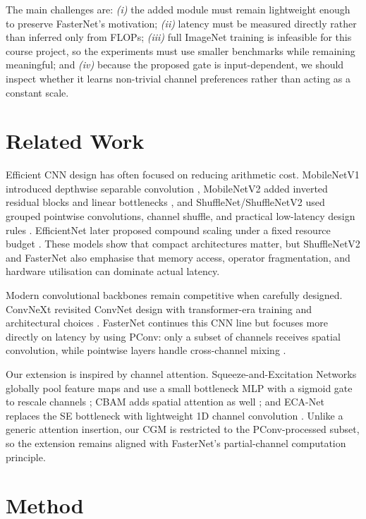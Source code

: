 \documentclass{article}
\begin{document}
The main challenges are: \emph{(i)} the added module must remain lightweight enough to preserve FasterNet's motivation; \emph{(ii)} latency must be measured directly rather than inferred only from FLOPs; \emph{(iii)} full ImageNet training is infeasible for this course project, so the experiments must use smaller benchmarks while remaining meaningful; and \emph{(iv)} because the proposed gate is input-dependent, we should inspect whether it learns non-trivial channel preferences rather than acting as a constant scale.

\section{Related Work}

Efficient CNN design has often focused on reducing arithmetic cost. MobileNetV1 introduced depthwise separable convolution \citep{howard2017mobilenets}, MobileNetV2 added inverted residual blocks and linear bottlenecks \citep{sandler2018mobilenetv2}, and ShuffleNet/ShuffleNetV2 used grouped pointwise convolutions, channel shuffle, and practical low-latency design rules \citep{zhang2018shufflenet,ma2018shufflenetv2}. EfficientNet later proposed compound scaling under a fixed resource budget \citep{tan2019efficientnet}. These models show that compact architectures matter, but ShuffleNetV2 and FasterNet also emphasise that memory access, operator fragmentation, and hardware utilisation can dominate actual latency.

Modern convolutional backbones remain competitive when carefully designed. ConvNeXt revisited ConvNet design with transformer-era training and architectural choices \citep{liu2022convnext}. FasterNet continues this CNN line but focuses more directly on latency by using PConv: only a subset of channels receives spatial convolution, while pointwise layers handle cross-channel mixing \citep{chen2023fasternet}.

Our extension is inspired by channel attention. Squeeze-and-Excitation Networks globally pool feature maps and use a small bottleneck MLP with a sigmoid gate to rescale channels \citep{hu2018senet}; CBAM adds spatial attention as well \citep{woo2018cbam}; and ECA-Net replaces the SE bottleneck with lightweight 1D channel convolution \citep{wang2020eca}. Unlike a generic attention insertion, our CGM is restricted to the PConv-processed subset, so the extension remains aligned with FasterNet's partial-channel computation principle.

\section{Method}
\end{document}
